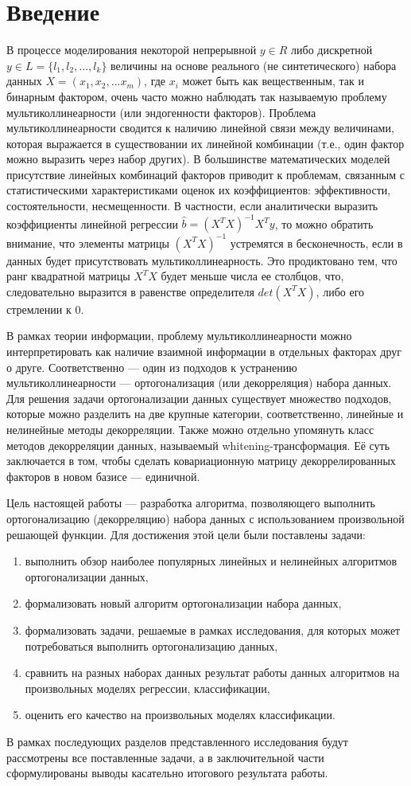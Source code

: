 \documentclass[runningheads]{llncs}
\begin{document}
\section{Введение}
В процессе моделирования некоторой непрерывной $y \in R$ либо дискретной $y \in L = \{l_1, l_2, ..., l_k\}$ величины на основе реального (не синтетического) набора данных $X = (x_1, x_2, ... x_m)$, где $x_i$ может быть как вещественным, так и бинарным фактором, очень часто можно наблюдать так называемую проблему мультиколлинеарности (или эндогенности факторов). Проблема мультиколлинеарности сводится к наличию линейной связи между величинами, которая выражается в существовании их линейной комбинации (т.е., один фактор можно выразить через набор других). В большинстве математических моделей присутствие линейных комбинаций факторов приводит к проблемам, связанным с статистическими характеристиками оценок их коэффициентов: эффективности, состоятельности, несмещенности. В частности, если аналитически выразить коэффициенты линейной регрессии $\hat{b} = (X^TX)^{-1}X^Ty$, то можно обратить внимание, что элементы матрицы $(X^TX)^{-1}$ устремятся в бесконечность, если в данных будет присутствовать мультиколлинеарность. Это продиктовано тем, что ранг квадратной матрицы $X^TX$ будет меньше числа ее столбцов, что, следовательно выразится в равенстве определителя $det(X^TX)$, либо его стремлении к $0$.
\par
В рамках теории информации, проблему мультиколлинеарности можно интерпретировать как наличие взаимной информации в отдельных факторах друг о друге. Соответственно — один из подходов к устранению мультиколлинеарности — ортогонализация (или декорреляция) набора данных. Для решения задачи ортогонализации данных существует множество подходов, которые можно разделить на две крупные категории,
соответственно, линейные и нелинейные методы декорреляции. Также можно отдельно упомянуть класс методов декорреляции данных, называемый whitening-трансформация. Её суть заключается в том, чтобы сделать ковариационную матрицу декоррелированных факторов в новом базисе — единичной. \par
Цель настоящей работы — разработка алгоритма, позволяющего выполнить ортогонализацию (декорреляцию) набора данных с использованием произвольной решающей функции. Для достижения этой цели были поставлены задачи:
\begin{enumerate}
  \item выполнить обзор наиболее популярных линейных и нелинейных алгоритмов ортогонализации данных,
  \item формализовать новый алгоритм ортогонализации набора данных,
  \item формализовать задачи, решаемые в рамках исследования, для которых может потребоваться выполнить ортогонализацию данных,
  \item сравнить на разных наборах данных результат работы данных алгоритмов на произвольных моделях регрессии, классификации,
  \item оценить его качество на произвольных моделях классификации.
\end{enumerate}
В рамках последующих разделов представленного исследования будут рассмотрены все поставленные задачи, а в заключительной части сформулированы выводы касательно итогового результата работы.
\end{document}
